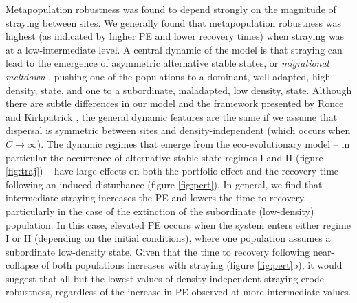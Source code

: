 \documentclass{revtex4}
\begin{document}
Metapopulation robustness was found to depend strongly on the magnitude of straying between sites.
We generally found that metapopulation robustness was highest (as indicated by higher PE and lower recovery times) when straying was at a low-intermediate level. 
A central dynamic of the model is that straying can lead to the emergence of asymmetric alternative stable states, or \emph{migrational meltdown} \citep{Ronce:2001dp}, pushing one of the populations to a dominant, well-adapted, high density, state, and one to a subordinate, maladapted, low density, state.
Although there are subtle differences in our model and the framework presented by Ronce and Kirkpatrick \citep{Ronce:2001dp}, the general dynamic features are the same if we assume that dispersal is symmetric between sites and density-independent (which occurs when $C\rightarrow\infty$).
The dynamic regimes that emerge from the eco-evolutionary model -- in particular the occurrence of alternative stable state regimes I and II (figure \ref{fig:traj}) -- have large effects on both the portfolio effect and the recovery time following an induced disturbance (figure \ref{fig:pert}).
In general, we find that intermediate straying increases the PE and lowers the time to recovery, particularly in the case of the extinction of the subordinate (low-density) population.
In this case, elevated PE occurs when the system enters either regime I or II (depending on the initial conditions), where one population assumes a subordinate low-density state. 
Given that the time to recovery following near-collapse of both populations increases with straying (figure \ref{fig:pert}b), it would suggest that all but the lowest values of density-independent straying erode robustness, regardless of the increase in PE observed at more intermediate values.

\end{document}
